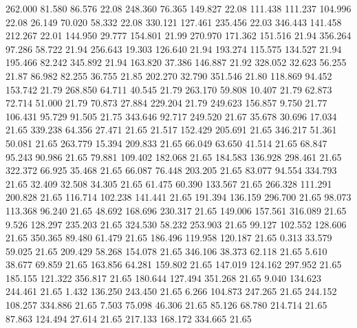  262.000   81.580   86.576        22.08
 248.360   76.365  149.827        22.08
 111.438  111.237  104.996        22.08
  26.149   70.020   58.332        22.08
 330.121  127.461  235.456        22.03
 346.443  141.458  212.267        22.01
 144.950   29.777  154.801        21.99
 270.970  171.362  151.516        21.94
 356.264   97.286   58.722        21.94
 256.643   19.303  126.640        21.94
 193.274  115.575  134.527        21.94
 195.466   82.242  345.892        21.94
 163.820   37.386  146.887        21.92
 328.052   32.623   56.255        21.87
  86.982   82.255   36.755        21.85
 202.270   32.790  351.546        21.80
 118.869   94.452  153.742        21.79
 268.850   64.711   40.545        21.79
 263.170   59.808   10.407        21.79
  62.873   72.714   51.000        21.79
  70.873   27.884  229.204        21.79
 249.623  156.857    9.750        21.77
 106.431   95.729   91.505        21.75
 343.646   92.717  249.520        21.67
  35.678   30.696   17.034        21.65
 339.238   64.356   27.471        21.65
  21.517  152.429  205.691        21.65
 346.217   51.361   50.081        21.65
 263.779   15.394  209.833        21.65
  66.049   63.650   41.514        21.65
  68.847   95.243   90.986        21.65
  79.881  109.402  182.068        21.65
 184.583  136.928  298.461        21.65
 322.372   66.925   35.468        21.65
  66.087   76.448  203.205        21.65
  83.077   94.554  334.793        21.65
  32.409   32.508   34.305        21.65
  61.475   60.390  133.567        21.65
 266.328  111.291  200.828        21.65
 116.714  102.238  141.441        21.65
 191.394  136.159  296.700        21.65
  98.073  113.368   96.240        21.65
  48.692  168.696  230.317        21.65
 149.006  157.561  316.089        21.65
   9.526  128.297  235.203        21.65
 324.530   58.232  253.903        21.65
  99.127  102.552  128.606        21.65
 350.365   89.480   61.479        21.65
 186.496  119.958  120.187        21.65
   0.313   33.579   59.025        21.65
 209.429   58.268  154.078        21.65
 346.106   38.373   62.118        21.65
   5.610   38.677   69.859        21.65
 163.856   64.281  159.802        21.65
 147.019  124.162  297.952        21.65
 185.155  121.322  356.817        21.65
 180.644  127.494  351.268        21.65
   9.040  134.623  244.461        21.65
   1.432  136.250  243.450        21.65
   6.266  104.873  247.265        21.65
 244.152  108.257  334.886        21.65
   7.503   75.098   46.306        21.65
  85.126   68.780  214.714        21.65
  87.863  124.494   27.614        21.65
 217.133  168.172  334.665        21.65

